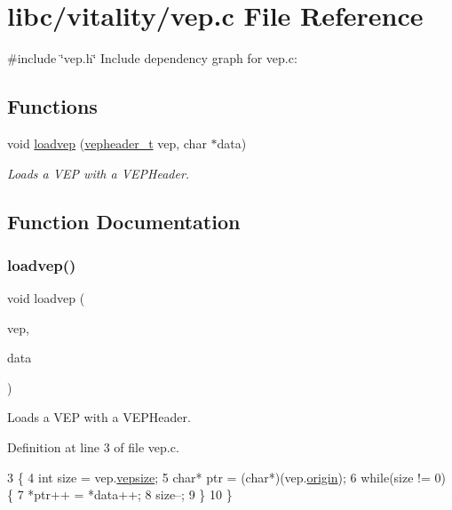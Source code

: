 \hypertarget{a00059}{}\section{libc/vitality/vep.c File Reference}
\label{a00059}
{\ttfamily \#include \char`\"{}vep.\+h\char`\"{}}\newline
Include dependency graph for vep.\+c\+:
\subsection*{Functions}
\begin{DoxyCompactItemize}
\item 
void \hyperlink{a00059_afa2deaad59ce4809eed53e7aeb3ac31b_afa2deaad59ce4809eed53e7aeb3ac31b}{loadvep} (\hyperlink{a00062_a78392c340e1fe1be344df81d1438b74f_a78392c340e1fe1be344df81d1438b74f}{vepheader\+\_\+t} vep, char $\ast$data)
\begin{DoxyCompactList}\small\item\em Loads a V\+EP with a V\+E\+P\+Header. \end{DoxyCompactList}\end{DoxyCompactItemize}


\subsection{Function Documentation}
\mbox{\label{a00059_afa2deaad59ce4809eed53e7aeb3ac31b_afa2deaad59ce4809eed53e7aeb3ac31b}} 
\subsubsection{\texorpdfstring{loadvep()}{loadvep()}}
{\footnotesize\ttfamily void loadvep (\begin{DoxyParamCaption}\item[{\hyperlink{a00062_a78392c340e1fe1be344df81d1438b74f_a78392c340e1fe1be344df81d1438b74f}{vepheader\+\_\+t}}]{vep,  }\item[{char $\ast$}]{data }\end{DoxyParamCaption})}



Loads a V\+EP with a V\+E\+P\+Header. 



Definition at line 3 of file vep.\+c.


\begin{DoxyCode}
3                                            \{
4     \textcolor{keywordtype}{int} size = vep.\hyperlink{a00080_a6121693fa5ac3673d831b440aea8963e_a6121693fa5ac3673d831b440aea8963e}{vepsize};
5     \textcolor{keywordtype}{char}* ptr = (\textcolor{keywordtype}{char}*)(vep.\hyperlink{a00080_aa81b6806dd33022ce60c314c908ba028_aa81b6806dd33022ce60c314c908ba028}{origin});
6     \textcolor{keywordflow}{while}(size != 0) \{
7         *ptr++ = *data++;
8         size--;
9     \}
10 \}
\end{DoxyCode}
